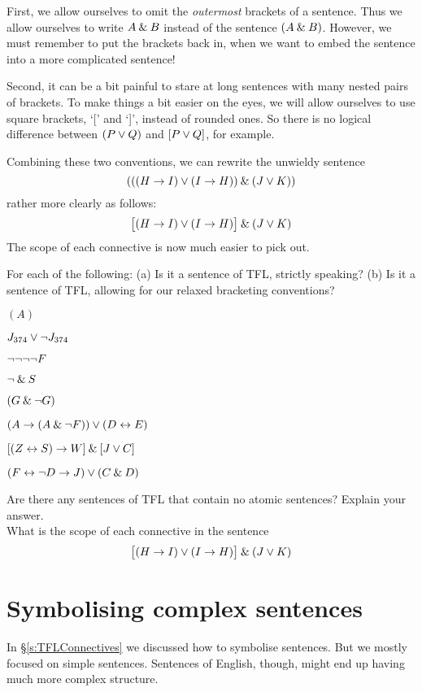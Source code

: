 First,  we allow ourselves to omit the \emph{outermost} brackets of a sentence. Thus we allow ourselves to write $A\mathbin{\&} B$ instead of the sentence $(A\mathbin{\&} B)$. However, we must remember to put the brackets back in, when we want to embed the sentence into a more complicated sentence!

Second, it can be a bit painful to stare at long sentences with many nested pairs of brackets. To make things a bit easier on the eyes, we will  allow ourselves to use square brackets, `[' and `]', instead of rounded ones. So there is no logical difference between $(P\vee Q)$ and $[P\vee Q]$, for example. 

Combining these two conventions, we can rewrite the unwieldy sentence
$$(((H \rightarrow I) \vee (I \rightarrow H)) \mathbin{\&} (J \vee K))$$
rather more clearly as follows:
$$\bigl[(H \rightarrow I) \vee (I \rightarrow H)\bigr] \mathbin{\&} (J \vee K)$$
The scope of each connective is now much easier to pick out.

\practiceproblems

\solutions
\problempart
\label{pr.wiffTFL}
For each of the following: (a) Is it a sentence of TFL, strictly speaking? (b) Is it a sentence of TFL, allowing for our relaxed bracketing conventions?
\begin{earg}
\item $(A)$
\item $J_{374} \vee \neg J_{374}$
\item $\neg \neg \neg \neg F$
\item $\neg \mathbin{\&} S$
\item $(G \mathbin{\&} \neg G)$
\item $(A \rightarrow (A \mathbin{\&} \neg F)) \vee (D \leftrightarrow E)$
\item $[(Z \leftrightarrow S) \rightarrow W] \mathbin{\&} [J \vee C]$
\item $(F \leftrightarrow \neg D \rightarrow J) \vee (C \mathbin{\&} D)$
\end{earg}

\problempart
Are there any sentences of TFL that contain no atomic sentences? Explain your answer.\\

\problempart
What is the scope of each connective in the sentence
$$\bigl[(H \rightarrow I) \vee (I \rightarrow H)\bigr] \mathbin{\&} (J \vee K)$$


\chapter{Symbolising complex sentences}\label{s:SymbolisingComplexTFL}
In \S\ref{s:TFLConnectives} we discussed how to symbolise sentences. But we mostly focused on simple sentences. Sentences of English, though, might end up having much more complex structure. 

